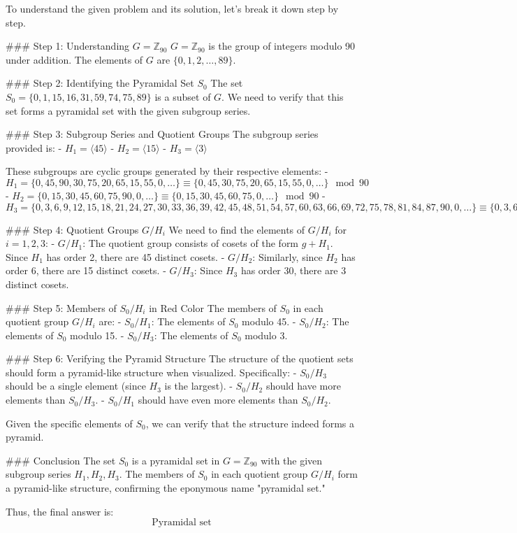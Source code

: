 To understand the given problem and its solution, let's break it down step by step.

### Step 1: Understanding \( G = \mathbb{Z}_{90} \)
\( G = \mathbb{Z}_{90} \) is the group of integers modulo 90 under addition. The elements of \( G \) are \( \{0, 1, 2, \ldots, 89\} \).

### Step 2: Identifying the Pyramidal Set \( S_0 \)
The set \( S_0 = \{0, 1, 15, 16, 31, 59, 74, 75, 89\} \) is a subset of \( G \). We need to verify that this set forms a pyramidal set with the given subgroup series.

### Step 3: Subgroup Series and Quotient Groups
The subgroup series provided is:
- \( H_1 = \langle 45 \rangle \)
- \( H_2 = \langle 15 \rangle \)
- \( H_3 = \langle 3 \rangle \)

These subgroups are cyclic groups generated by their respective elements:
- \( H_1 = \{0, 45, 90, 30, 75, 20, 65, 15, 55, 0, \ldots\} \equiv \{0, 45, 30, 75, 20, 65, 15, 55, 0, \ldots\} \mod 90 \)
- \( H_2 = \{0, 15, 30, 45, 60, 75, 90, 0, \ldots\} \equiv \{0, 15, 30, 45, 60, 75, 0, \ldots\} \mod 90 \)
- \( H_3 = \{0, 3, 6, 9, 12, 15, 18, 21, 24, 27, 30, 33, 36, 39, 42, 45, 48, 51, 54, 57, 60, 63, 66, 69, 72, 75, 78, 81, 84, 87, 90, 0, \ldots\} \equiv \{0, 3, 6, 9, 12, 15, 18, 21, 24, 27, 30, 33, 36, 39, 42, 45, 48, 51, 54, 57, 60, 63, 66, 69, 72, 75, 78, 81, 84, 87, 0, \ldots\} \mod 90 \)

### Step 4: Quotient Groups \( G / H_i \)
We need to find the elements of \( G / H_i \) for \( i = 1, 2, 3 \):
- \( G / H_1 \): The quotient group consists of cosets of the form \( g + H_1 \). Since \( H_1 \) has order 2, there are 45 distinct cosets.
- \( G / H_2 \): Similarly, since \( H_2 \) has order 6, there are 15 distinct cosets.
- \( G / H_3 \): Since \( H_3 \) has order 30, there are 3 distinct cosets.

### Step 5: Members of \( S_0 / H_i \) in Red Color
The members of \( S_0 \) in each quotient group \( G / H_i \) are:
- \( S_0 / H_1 \): The elements of \( S_0 \) modulo 45.
- \( S_0 / H_2 \): The elements of \( S_0 \) modulo 15.
- \( S_0 / H_3 \): The elements of \( S_0 \) modulo 3.

### Step 6: Verifying the Pyramid Structure
The structure of the quotient sets should form a pyramid-like structure when visualized. Specifically:
- \( S_0 / H_3 \) should be a single element (since \( H_3 \) is the largest).
- \( S_0 / H_2 \) should have more elements than \( S_0 / H_3 \).
- \( S_0 / H_1 \) should have even more elements than \( S_0 / H_2 \).

Given the specific elements of \( S_0 \), we can verify that the structure indeed forms a pyramid.

### Conclusion
The set \( S_0 \) is a pyramidal set in \( G = \mathbb{Z}_{90} \) with the given subgroup series \( H_1, H_2, H_3 \). The members of \( S_0 \) in each quotient group \( G / H_i \) form a pyramid-like structure, confirming the eponymous name "pyramidal set."

Thus, the final answer is:
\[
\boxed{\text{Pyramidal set}}
\]
